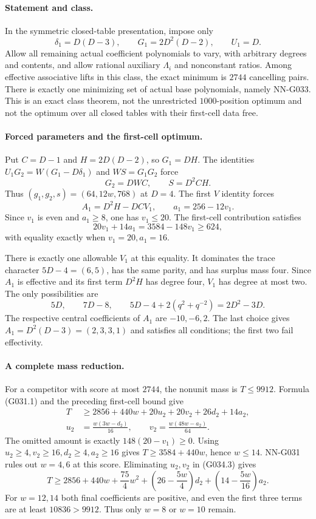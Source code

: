 \paragraph{Statement and class.}
In the symmetric closed-table presentation, impose only
\[
 \delta_1=D(D-3),\qquad G_1=2D^2(D-2),\qquad U_1=D.   \tag{G034.1}
\]
Allow all remaining actual coefficient polynomials to vary,
with arbitrary degrees and contents, and allow rational
auxiliary $\Lambda_i$ and nonconstant ratios.
Among effective associative lifts in this class, the exact
minimum is $2744$ cancelling pairs. There is exactly one
minimizing set of actual base polynomials, namely NN-G033.
This is an exact class theorem, not the unrestricted
$1000$-position optimum and not the optimum over all closed
tables with their first-cell data free.

\paragraph{Forced parameters and the first-cell optimum.}
Put $C=D-1$ and $H=2D(D-2)$, so $G_1=DH$.
The identities $U_1G_2=W(G_1-D\delta_1)$ and
$WS=G_1G_2$ force
\[
                  G_2=DWC,\qquad S=D^2CH.            \tag{G034.2}
\]
Thus $(g_1,g_2,s)=(64,12w,768)$ at $D=4$.
The first $V$ identity forces
\[
 A_1=D^2H-DCV_1,\qquad a_1=256-12v_1.
\]
Since $v_1$ is even and $a_1\ge8$, one has $v_1\le20$.
The first-cell contribution satisfies
\[
 20v_1+14a_1=3584-148v_1\ge624,
\]
with equality exactly when $v_1=20,a_1=16$.

There is exactly one allowable $V_1$ at this equality.
It dominates the trace character $5D-4=(6,5)$,
has the same parity, and has surplus mass four.
Since $A_1$ is effective and its first term $D^2H$
has degree four, $V_1$ has degree at most two.
The only possibilities are
\[
 5D,\qquad7D-8,\qquad5D-4+2(q^2+q^{-2})=2D^2-3D.
\]
The respective central coefficients of $A_1$ are
$-10,-6,2$. The last choice gives
$A_1=D^2(D-3)=(2,3,3,1)$ and satisfies all conditions;
the first two fail effectivity.

\paragraph{A complete mass reduction.}
For a competitor with score at most $2744$, the nonunit
mass is $T\le9912$. Formula (G031.1) and the preceding
first-cell bound give
\[
 \begin{aligned}
 T&\ge2856+440w+20u_2+20v_2+26d_2+14a_2,\\
 u_2&=\frac{w(3w-d_2)}{16},\qquad
 v_2=\frac{w(48w-a_2)}{64}.                         \end{aligned} \tag{G034.3}
\]
The omitted amount is exactly $148(20-v_1)\ge0$.
Using $u_2\ge4,v_2\ge16,d_2\ge4,a_2\ge16$ gives
$T\ge3584+440w$, hence $w\le14$.
NN-G031 rules out $w=4,6$ at this score.
Eliminating $u_2,v_2$ in (G034.3) gives
\[
 T\ge2856+440w+\frac{75}{4}w^2
       +\left(26-\frac{5w}{4}\right)d_2
       +\left(14-\frac{5w}{16}\right)a_2.           \tag{G034.4}
\]
For $w=12,14$ both final coefficients are positive,
and even the first three terms are at least
$10836>9912$. Thus only $w=8$ or $w=10$ remain.

